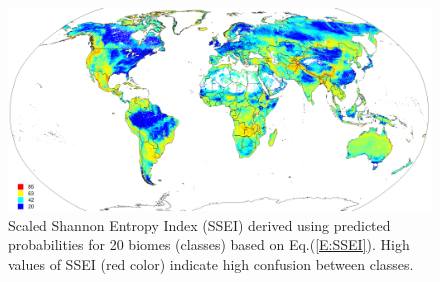\documentclass[fleqn,10pt,lineno]{wlpeerj} %
\begin{document}
\begin{figure}[!hbt]
\centering
\includegraphics[width=\linewidth]{Fig_7.png}
\caption{Scaled Shannon Entropy Index (SSEI) derived using predicted probabilities for 20 biomes (classes) based on Eq.(\ref{E:SSEI}). High values of SSEI (red color) indicate high confusion between classes.}
\label{Fig_global_biomes_map_SSEI}
\end{figure}
\end{document}

